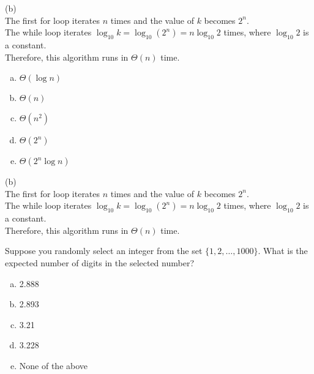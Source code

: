\begin{solution}
(b) \\
The first for loop iterates $n$ times and the value of $k$ becomes $2^n$. \\
The while loop iterates $\log_{10} k = \log_{10} (2^n) = n \log_{10} 2$ times, where $\log_{10} 2$ is a constant. \\
Therefore, this algorithm runs in $\Theta(n)$ time.
\end{solution}

\newpage
\begin{enumerate}[(a)]
	\item  $\Theta(\log n)$

	\item  $\Theta(n)$

	\item  $\Theta(n^2)$

	\item  $\Theta(2^n)$

	\item  $\Theta(2^n \log n)$

\end{enumerate}
\begin{solution}

(b) \\
The first for loop iterates $n$ times and the value of $k$ becomes $2^n$. \\
The while loop iterates $\log_{10} k = \log_{10} (2^n) = n \log_{10} 2$ times, where $\log_{10} 2$ is a constant. \\
Therefore, this algorithm runs in $\Theta(n)$ time.

\end{solution}


Suppose you randomly select an integer from the set $\{1, 2, \dots, 1000\}$. What is the expected number of digits in the selected number?

\begin{enumerate}[a)]
    \item 2.888
    \item 2.893
    \item 3.21
    \item 3.228
    \item None of the above
\end{enumerate}

